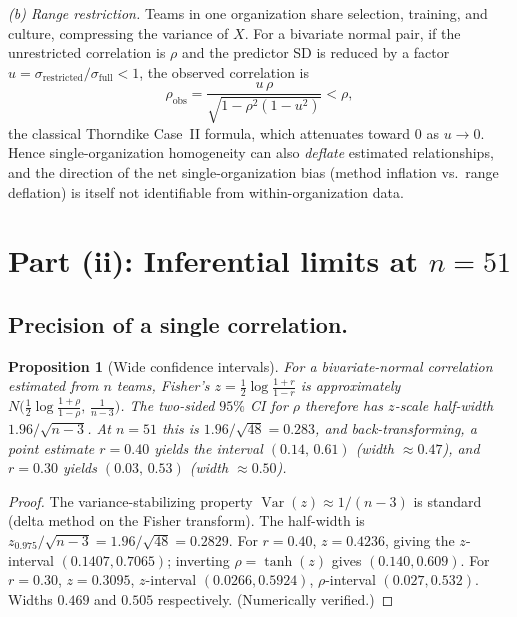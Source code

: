 \documentclass{amsart}
\newtheorem{proposition}{Proposition}
\theoremstyle{definition}
\begin{document}
\emph{(b) Range restriction.} Teams in one organization share selection,
training, and culture, compressing the variance of $X$. For a bivariate
normal pair, if the unrestricted correlation is $\rho$ and the predictor SD
is reduced by a factor $u=\sigma_{\text{restricted}}/\sigma_{\text{full}}<1$,
the observed correlation is
\[
  \rho_{\text{obs}}=\frac{u\,\rho}{\sqrt{1-\rho^2(1-u^2)}}<\rho,
\]
the classical Thorndike Case~II formula, which attenuates toward $0$ as
$u\to0$. Hence single-organization homogeneity can also \emph{deflate}
estimated relationships, and the direction of the net single-organization
bias (method inflation vs.\ range deflation) is itself not identifiable from
within-organization data.

\section*{Part (ii): Inferential limits at $n=51$}

\subsection*{Precision of a single correlation.}
\begin{proposition}[Wide confidence intervals]\label{prop:ci}
For a bivariate-normal correlation estimated from $n$ teams, Fisher's
$z=\tfrac12\log\frac{1+r}{1-r}$ is approximately $N\!\big(\tfrac12\log\frac{1+\rho}{1-\rho},\,\frac1{n-3}\big)$.
The two-sided $95\%$ CI for $\rho$ therefore has $z$-scale half-width
$1.96/\sqrt{n-3}$. At $n=51$ this is $1.96/\sqrt{48}=0.283$, and back-transforming,
a point estimate $r=0.40$ yields the interval $(0.14,\,0.61)$ (width $\approx0.47$),
and $r=0.30$ yields $(0.03,\,0.53)$ (width $\approx0.50$).
\end{proposition}

\begin{proof}
The variance-stabilizing property $\operatorname{Var}(z)\approx 1/(n-3)$ is
standard (delta method on the Fisher transform). The half-width is
$z_{0.975}/\sqrt{n-3}=1.96/\sqrt{48}=0.2829$. For $r=0.40$,
$z=0.4236$, giving the $z$-interval $(0.1407,0.7065)$; inverting
$\rho=\tanh(z)$ gives $(0.140,0.609)$. For $r=0.30$, $z=0.3095$,
$z$-interval $(0.0266,0.5924)$, $\rho$-interval $(0.027,0.532)$. Widths
$0.469$ and $0.505$ respectively. (Numerically verified.)
\end{proof}
\end{document}
